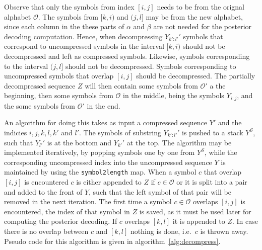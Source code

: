 Observe that only the symbols from index $[i,j]$ needs to be from the orignal
alphabet $\mathcal{O}$. The symbols from $[k, i)$ and $(j, l]$ may be from the
new alphabet, since each column in the these parts of $\alpha$ and $\beta$ are
not needed for the posterior decoding computation. Hence, when decompressing
$Y_{k':l'}'$ symbols that correspond to uncompressed symbols in the interval
$[k, i)$ should not be decompressed and left as compressed symbols. Likewise,
symbols corresponding to the interval $(j, l]$ should not be
decompressed. Symbols corresponding to uncompressed symbols that overlap
$[i, j]$ should be decompressed. The partially decompressed sequence $Z$ will
then contain some symbols from $\mathcal{O'}$ a the beginning, then some
symbols from $\mathcal{O}$ in the middle, being the symbols $Y_{i:j}$, and the
some symbols from $\mathcal{O'}$ in the end.

An algorithm for doing this takes as input a compressed sequence $Y'$ and the
indicies $i, j, k, l, k'$ and $l'$. The symbols of substring $Y_{k':l'}'$ is
pushed to a stack $Y^S$, such that $Y_{l'}'$ is at the bottom and $Y_{k'}'$ at
the top. The algorithm may be implemented iteratively, by popping symbols one
by one from $Y^S$, while the corresponding uncompressed index into the
uncompressed sequence $Y$ is maintained by using the \texttt{symbol2length}
map. When a symbol $c$ that overlap $[i, j]$ is encountered $c$ is either
appended to $Z$ if $c \in \mathcal{O}$ or it is split into a pair and added to
the front of $Y$, such that the left symbol of that pair will be removed in the
next iteration. The first time a symbol $c \in \mathcal{O}$ overlaps $[i, j]$
is encountered, the index of that symbol in $Z$ is saved, as it must be used
later for computing the posterior decoding. If $c$ overlaps $[k, l]$ it is
appended to $Z$. In case there is no overlap between $c$ and $[k, l]$ nothing
is done, i.e.\ $c$ is thrown away. Pseudo code for this algorithm is given in
algorithm~\ref{alg:decompress}.

